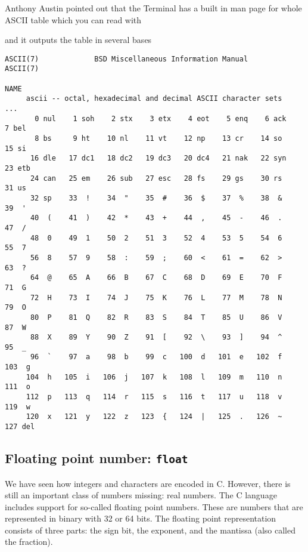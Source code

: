 Anthony Austin pointed out that the Terminal has a built in man page for whole ASCII table which you can read with


and it outputs the table in several bases

\begin{verbatim}
ASCII(7)             BSD Miscellaneous Information Manual             ASCII(7)

NAME
     ascii -- octal, hexadecimal and decimal ASCII character sets
...
       0 nul    1 soh    2 stx    3 etx    4 eot    5 enq    6 ack    7 bel
       8 bs     9 ht    10 nl    11 vt    12 np    13 cr    14 so    15 si
      16 dle   17 dc1   18 dc2   19 dc3   20 dc4   21 nak   22 syn   23 etb
      24 can   25 em    26 sub   27 esc   28 fs    29 gs    30 rs    31 us
      32 sp    33  !    34  "    35  #    36  $    37  %    38  &    39  '
      40  (    41  )    42  *    43  +    44  ,    45  -    46  .    47  /
      48  0    49  1    50  2    51  3    52  4    53  5    54  6    55  7
      56  8    57  9    58  :    59  ;    60  <    61  =    62  >    63  ?
      64  @    65  A    66  B    67  C    68  D    69  E    70  F    71  G
      72  H    73  I    74  J    75  K    76  L    77  M    78  N    79  O
      80  P    81  Q    82  R    83  S    84  T    85  U    86  V    87  W
      88  X    89  Y    90  Z    91  [    92  \    93  ]    94  ^    95  _
      96  `    97  a    98  b    99  c   100  d   101  e   102  f   103  g
     104  h   105  i   106  j   107  k   108  l   109  m   110  n   111  o
     112  p   113  q   114  r   115  s   116  t   117  u   118  v   119  w
     120  x   121  y   122  z   123  {   124  |   125  .   126  ~   127 del
\end{verbatim}



\subsection{Floating point number: \texttt{float}}

We have seen how integers and characters are encoded in C. However, there is still an important class of numbers missing: real numbers. The C language includes support for so-called floating point numbers. These are numbers that are represented in binary with 32 or 64 bits. The floating point representation consists of three parts: the sign bit, the exponent, and the mantissa (also called the fraction).

